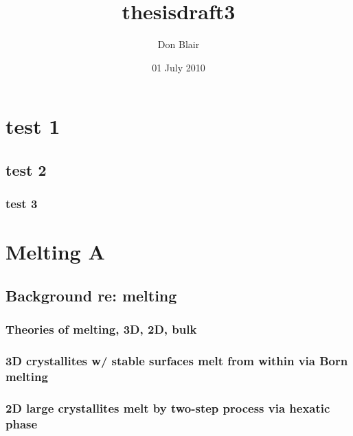 \documentclass{article}
\title{thesisdraft3}
\author{Don Blair}
\date{01 July 2010}
\begin{document}
\setcounter{tocdepth}{5}
\tableofcontents

\section{test 1}

\subsection{test 2}

\subsubsection{test 3}

\section{Melting A}

\subsection{Background re: melting}

\subsubsection{Theories of melting, 3D, 2D, bulk}




\subsubsection{ 3D crystallites w/ stable surfaces melt from within via Born melting}
\subsubsection{ 2D large crystallites melt by two-step process via hexatic phase}
\end{document}
